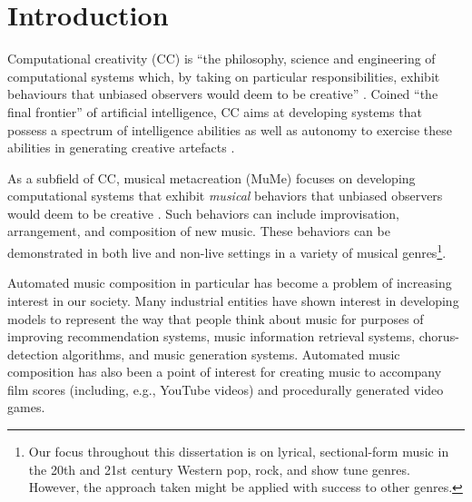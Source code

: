 \documentclass[phd,electronic,oneside,twosidetoc,letterpaper,chaptercenter,parttop,lof,lot]{byumsphd}
\title{\Title}
\author{\Author}
\begin{document}
\maketitle
{}

\chapter{Introduction}

Computational creativity (CC) is ``the philosophy, science and engineering of computational systems which, by taking on particular responsibilities, exhibit behaviours that unbiased observers would deem to be creative'' \citep{colton2012computational}. Coined ``the final frontier'' of artificial intelligence, CC aims at developing systems that possess a spectrum of intelligence abilities as well as autonomy to exercise these abilities in generating creative artefacts \cite{Jennings2010DevelopingIntelligence}.

As a subfield of CC, musical metacreation (MuMe) focuses on developing computational systems that exhibit \emph{musical} behaviors that unbiased observers would deem to be creative \cite{Bodily2018MusicalFuture}. Such behaviors can include improvisation, arrangement, and composition of new music. These behaviors can be demonstrated in both live and non-live settings in a variety of musical genres\footnote{Our focus throughout this dissertation is on lyrical, sectional-form music in the 20th and 21st century Western pop, rock, and show tune genres. However, the approach taken might be applied with success to other genres.}.

Automated music composition in particular has become a problem of increasing interest in our society. Many industrial entities have shown interest in developing models to represent the way that people think about music for purposes of improving recommendation systems, music information retrieval systems, chorus-detection algorithms, and music generation systems. Automated music composition has also been a point of interest for creating music to accompany film scores (including, e.g., YouTube videos) and procedurally generated video games.
\end{document}
